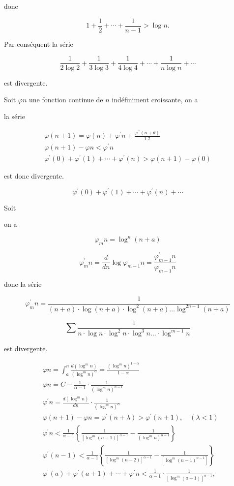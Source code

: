 \documentclass{article}
\begin{document}
donc

\[
1+\frac{1}{2}+\cdots+\frac{1}{n-1}>\log n .
\]

Par conséquent la série

\[
\frac{1}{2 \log 2}+\frac{1}{3 \log 3}+\frac{1}{4 \log 4}+\cdots+\frac{1}{n \log n}+\cdots
\]

est divergente.

Soit \(\varphi n\) une fonction continue de \(n\) indéfiniment croissante, on a

la série

\[
\begin{gathered}
\varphi(n+1)=\varphi(n)+\varphi^{\prime} n+\frac{\varphi^{\prime \prime}(n+\theta)}{1.2} \\
\varphi(n+1)-\varphi n<\varphi^{\prime} n \\
\varphi^{\prime}(0)+\varphi^{\prime}(1)+\cdots+\varphi^{\prime}(n)>\varphi(n+1)-\varphi(0)
\end{gathered}
\]

est donc divergente.

\[
\varphi^{\prime}(0)+\varphi^{\prime}(1)+\cdots+\varphi^{\prime}(n)+\cdots
\]

Soit

on a

\[
\varphi_{m} n=\log ^{n}(n+a)
\]

\[
\varphi_{m}^{\prime} n=\frac{d}{d n} \log \varphi_{m-1} n=\frac{\varphi_{m-1}^{\prime} n}{\varphi_{m-1} n}
\]

donc la série

\[
\varphi_{m}^{\prime} n=\frac{1}{(n+a) \cdot \log (n+a) \cdot \log ^{2}(n+a) \ldots \log ^{2 n-1}(n+a)}
\]

\[
\sum \frac{1}{n \cdot \log n \cdot \log ^{2} n \cdot \log ^{3} n \ldots \cdot \log ^{m-1} n}
\]

est divergente.

\[
\begin{aligned}
& \varphi n=\int_{a}^{n} \frac{d\left(\log ^{m} n\right)}{\left(\log ^{m} n\right)^{\alpha}}=\frac{\left(\log ^{m} n\right)^{1-\alpha}}{1-\alpha} \\
& \varphi n=C-\frac{1}{\alpha-1} \cdot \frac{1}{\left(\log ^{m} n\right)^{\alpha-1}} \\
& \varphi^{\prime} n=\frac{d\left(\log ^{m} n\right)}{d n} \cdot \frac{1}{\left(\log ^{m} n\right)^{\alpha}} \\
& \varphi(n+1)-\varphi n=\varphi^{\prime}(n+\lambda)>\varphi^{\prime}(n+1), \quad(\lambda<1) \\
& \varphi^{\prime} n<\frac{1}{\alpha-1}\left\{\frac{1}{\left[\log ^{m}(n-1)\right]^{\alpha-1}}-\frac{1}{\left(\log ^{m} n\right)^{\alpha-1}}\right\} \\
& \varphi^{\prime}(n-1)<\frac{1}{\alpha-1}\left\{\frac{1}{\left[\log ^{m}(n-2)\right]^{\alpha-1}}-\frac{1}{\left[\log ^{m}(n-1)^{\alpha-1}\right]}\right\} \\
& \varphi^{\prime}(a)+\varphi^{\prime}(a+1)+\cdots+\varphi^{\prime} n<\frac{1}{\alpha-1} \cdot \frac{1}{\left[\log ^{m}(a-1)\right]^{\alpha-1}},
\end{aligned}
\]
\end{document}
